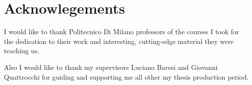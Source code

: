 \chapter*{Acknowlegements}


I would like to thank Politecnico Di Milano professors of the courses I took for the dedication to their work and interesting, cutting-edge material they were teaching us.

\vspace{0.5cm}
\noindent Also I would like to thank my supervisors Luciano Baresi and Giovanni Quattrocchi for guiding and supporting me all other my thesis production period.
